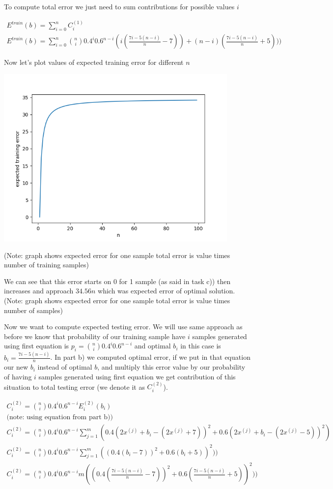 \documentclass[a4paper]{article}
\begin{document}
To compute total error we just need to sum contributions for possible values $i$

\begin{align*}
	E^{train}(b) = \sum_{i=0}^{n} C_i^{(1)}
	\\
	E^{train}(b) = \sum_{i=0}^{n} \binom{n}{i}0.4^i0.6^{n-i}(i(\frac{7i-5(n-i)}{n}-7)) + (n-i)(\frac{7i-5(n-i)}{n} +5)))
\end{align*}

Now let's plot values of expected training error for different $n$

\centerline{\includegraphics[width=0.9\textwidth]{training_error}}
(Note: graph shows expected error for one sample total error is value times number of training samples)

We can see that this error starts on 0 for 1 sample (as said in task c)) then increases and approach $34.56n$ which was expected error of optimal solution.
(Note: graph shows expected error for one sample total error is value times number of samples)


Now we want to compute expected testing error. We will use same approach as before we know that probability of our training sample have $i$ samples generated using first equation is $p_i=\binom{n}{i}0.4^i0.6^{n-i}$ and optimal $b_i$ in this case is $b_i = \frac{7i-5(n-i)}{n}$. In part b) we computed optimal error, if we put in that equation our new $b_i$ instead of optimal $b$, and multiply this error value by our probability of having $i$ samples generated using first equation we get contribution of this situation to total testing error (we denote it as $C_i^{(2)}$).

 \begin{align*}
 	C_i^{(2)} = \binom{n}{i}0.4^i0.6^{n-i}E_i^{(2)}(b_i)
 	\\
 	\text{(note: using equation from part b))}
 	\\
 	C_i^{(2)} = \binom{n}{i}0.4^i0.6^{n-i}\sum_{j=1}^{m}(0.4(2x^{(j)} + b_i - (2x^{(j)}+7))^2 + 0.6(2x^{(j)} + b_i - (2x^{(j)}-5))^2)
 	\\
 	C_i^{(2)} = \binom{n}{i}0.4^i0.6^{n-i}\sum_{j=1}^{m}((0.4(b_i-7))^2 + 0.6(b_i+5))^2))
 	\\
 	C_i^{(2)} = \binom{n}{i}0.4^i0.6^{n-i}m((0.4(\frac{7i-5(n-i)}{n}-7))^2 + 0.6(\frac{7i-5(n-i)}{n}+5))^2))
 \end{align*}
\end{document}
